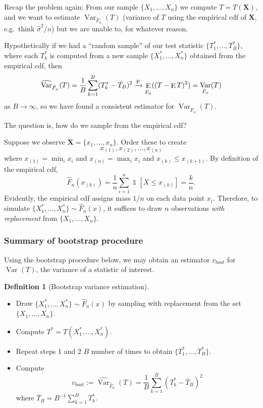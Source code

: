 \documentclass[
]{book}
\newcommand{\bX}{{\boldsymbol X}}
\DeclareMathOperator{\E}{E}
\DeclareMathOperator{\Var}{Var}
\DeclareMathOperator{\ind}{\mathds{1}}
\theoremstyle{definition}
\newtheorem{definition}{Definition}[chapter]
\theoremstyle{definition}
\theoremstyle{definition}
\theoremstyle{definition}
\theoremstyle{remark}
\begin{document}
Recap the problem again: From our sample \(\{X_1,\dots,X_n\}\) we compute \(T=T(\bX)\), and we want to estimate \(\Var_{\hat F_n}(T)\) (variance of \(T\) using the empirical cdf of \(\bX\), e.g.~think \(\hat\sigma^2/n\)) but we are unable to, for whatever reason.

Hypothetically if we had a ``random sample'' of our test statistic \(\{T_1^*,\dots,T_B^*\}\), where each \(T_k^*\) is computed from a new sample \(\{X_1^*,\dots,X_n^*\}\) obtained from the empirical cdf, then
\[
\widehat{\Var}_{\hat F_n}(T) = \frac{1}{B} \sum_{k=1}^B (T_k^* - \bar T_B )^2 \xrightarrow{\text P}  \E_{\hat F_n}((T-\E T)^2) = \Var_{\hat F_n}(T)
\]
as \(B\to\infty\), so we have found a consistent estimator for \(\Var_{\hat F_n}(T)\).

The question is, how do we sample from the empirical cdf?

Suppose we observe \(\bX = \{x_1,\dots,x_n\}\). Order these to create
\[
x_{(1)}, x_{(2)}, \dots, x_{(n)}
\]
where \(x_{(1)}=\min_i x_i\) and \(x_{(n)}=\max_i x_i\) and \(x_{(k)} \leq x_{(k+1)}\).
By definition of the empirical cdf,
\[
\hat F_n(x_{(k)}) = \frac{1}{n} \sum_{i=1}^n \ind [X \leq x_{(k)}] = \frac{k}{n}.
\]
Evidently, the empirical cdf assigns mass \(1/n\) on each data point \(x_i\). Therefore, to simulate \(\{X_1^*,\dots,X_n^*\}\sim \hat F_n(x)\), it suffices to draw \(n\) observations \emph{with replacement} from \(\{X_1,\dots,X_n\}\).

\hypertarget{summary-of-bootstrap-procedure}{%
\subsubsection{Summary of bootstrap procedure}\label{summary-of-bootstrap-procedure}}

Using the bootstrap procedure below, we may obtain an estimator \(v_{boot}\) for \(\Var(T)\), the variance of a statistic of interest.

\begin{definition}[Bootstrap variance estimation]
\protect\hypertarget{def:bootstrap}{}\label{def:bootstrap}

\begin{itemize}
\item
  Draw \(\{X_1^*,\dots,X_n^*\}\sim \hat F_n(x)\) by sampling with replacement from the set \(\{X_1,\dots,X_n\}\).
\item
  Compute \(T^*=T(X_1^*,\dots,X_n^*)\).
\item
  Repeat steps 1 and 2 \(B\) number of times to obtain \(\{T^*_1,\dots,T^*_B\}\).
\item
  Compute
  \[
  v_{boot} := \widehat{\Var}_{\hat F_n}(T) = \frac{1}{B} \sum_{k=1}^B (T_k^* - \bar T_B )^2
  \]
  where \(\bar T_B = B^{-1}\sum_{k=1}^B T_k^*\).
\end{itemize}

\end{definition}
\end{document}

